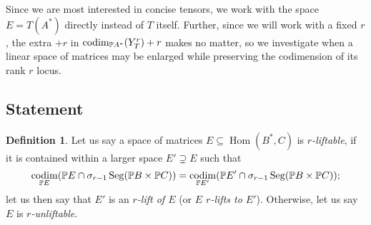 \documentclass[a4paper,10pt]{article}
\DeclareMathOperator{\Hom}{Hom}\let\hom\Hom
\DeclareMathOperator{\codim}{codim}
\DeclareMathOperator{\Seg}{Seg}
\theoremstyle{definition}
\newtheorem{definition}[theorem]{Definition}
\theoremstyle{remark}
\begin{document}
Since we are most interested in concise tensors, we work with the space $E=T(A^*)$ directly instead of $T$ itself. Further, since we will work with a fixed $r$, the extra $+r$ in $\codim_{\pe A^*}(Y^r_T)+r$ makes no matter, so we investigate when a linear space of matrices may be enlarged while preserving the codimension of its rank $r$ locus.

\subsection{Statement}

\begin{definition}
    Let us say a space of matrices $E\subseteq \Hom(B^*,C)$ is \emph{$r$-liftable}, if it is contained within a larger space $E'\supsetneq E$ such that
    \[
        \codim_{\pe E}(\pe E\cap \sigma_{r-1}\Seg(\pe B\times\pe C)) = \codim_{\pe E'}({\pe E'}\cap \sigma_{r-1}\Seg(\pe B\times\pe C));
    \]
    let us then say that $E'$ is an \emph{$r$-lift of $E$} (or \emph{$E$ $r$-lifts to $E'$}).
    Otherwise, let us say $E$ is \emph{$r$-unliftable}.
\end{definition}
\end{document}
